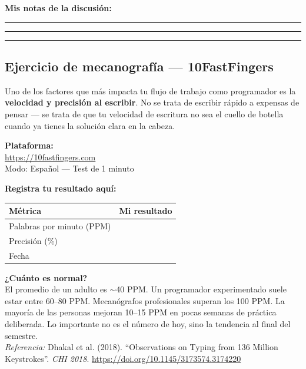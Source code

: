 \documentclass[12pt, oneside]{article}
\begin{document}
\vspace{0.5cm}
\noindent\textbf{Mis notas de la discusión:}

\vspace{3cm}
\noindent\rule{\textwidth}{0.4pt}
\vspace{2.5cm}
\noindent\rule{\textwidth}{0.4pt}
\vspace{2.5cm}
\noindent\rule{\textwidth}{0.4pt}

\subsection{Ejercicio de mecanografía — 10FastFingers}

Uno de los factores que más impacta tu flujo de trabajo como programador es la
\textbf{velocidad y precisión al escribir}. No se trata de escribir rápido a
expensas de pensar — se trata de que tu velocidad de escritura no sea el
cuello de botella cuando ya tienes la solución clara en la cabeza.

\begin{center}
  \large\textbf{Plataforma:}\\[6pt]
  \url{https://10fastfingers.com}\\[4pt]
  {\small Modo: Español — Test de 1 minuto}
\end{center}

\noindent\textbf{Registra tu resultado aquí:}

\begin{center}
\begin{tabular}{lc}
  \toprule
  \textbf{Métrica} & \textbf{Mi resultado} \\
  \midrule
  Palabras por minuto (PPM) & \hspace{3cm} \\[8pt]
  Precisión (\%)            & \hspace{3cm} \\[8pt]
  Fecha                     & \hspace{3cm} \\
  \bottomrule
\end{tabular}
\end{center}

\begin{tecnico}
  \textbf{¿Cuánto es normal?}\\
  El promedio de un adulto es $\sim$40 PPM. Un programador experimentado
  suele estar entre 60--80 PPM. Mecanógrafos profesionales superan los
  100 PPM. La mayoría de las personas mejoran 10--15 PPM en pocas semanas
  de práctica deliberada. Lo importante no es el número de hoy, sino la
  tendencia al final del semestre.\\
  \textit{Referencia:} Dhakal et al. (2018). ``Observations on Typing from
  136 Million Keystrokes''. \textit{CHI 2018}. \url{https://doi.org/10.1145/3173574.3174220}
\end{tecnico}
\end{document}

